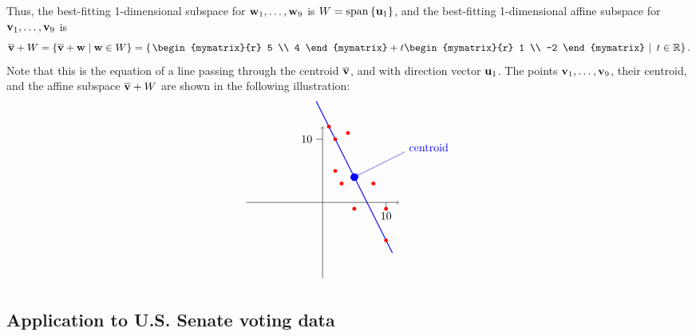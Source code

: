 \begin{solution}
  Thus, the best-fitting 1-dimensional subspace for
  $\vect{w}_1,\ldots,\vect{w}_9$ is $W = \sspan\set{\vect{u}_1}$, and
  the best-fitting 1-dimensional affine subspace for
  $\vect{v}_1,\ldots,\vect{v}_9$ is
  \begin{equation*}
    \centroid{\vect{v}} + W
    = \set{\centroid{\vect{v}} + \vect{w} \mid \vect{w}\in W}
    = \set{\left.\begin{mymatrix}{r} 5 \\ 4 \end{mymatrix} +
        t\begin{mymatrix}{r} 1 \\ -2 \end{mymatrix} ~\right\vert~ t\in\R}.
  \end{equation*}
  Note that this is the equation of a line passing through the
  centroid $\centroid{\vect{v}}$, and with direction vector
  $\vect{u}_1$. The points $\vect{v}_1,\ldots,\vect{v}_9$, their
  centroid, and the affine subspace $\centroid{\vect{v}} + W$ are
  shown in the following illustration:
  \begin{equation*}
    \begin{tikzpicture}[scale=0.2]
      \draw[thin,->] (-12,0) -- (12,0);
      \draw[thin,->] (0,-12) -- (0,12);
      \draw[thin] (0,10) -- (-1,10) node[left] {$10$};
      \draw[thin] (10,0) -- (10,-1) node[below] {$10$};
      \draw[thick,blue] (5,4) +(-6,12) -- +(6,-12);
      \fill[color=blue] (5,4) circle (0.6);
      \draw[blue, ->] (5,4) +(8,4) node[right,yshift=4] {centroid} -- +(0.4,0.2);
      \fill[color=red] (10, -6) circle (0.3);
      \fill[color=red] (10, -1) circle (0.3);
      \fill[color=red] (5, -1) circle (0.3);
      \fill[color=red] (8, 3) circle (0.3);
      \fill[color=red] (3, 3) circle (0.3);
      \fill[color=red] (2, 5) circle (0.3);
      \fill[color=red] (2, 10) circle (0.3);
      \fill[color=red] (4, 11) circle (0.3);
      \fill[color=red] (1, 12) circle (0.3);
    \end{tikzpicture}
  \end{equation*}
  \vspace{-4ex}\par  
\end{solution}

\subsection*{Application to U.S. Senate voting data}


